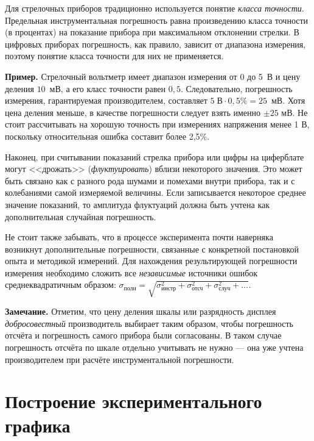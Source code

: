 Для стрелочных приборов традиционно используется понятие \emph{класса
точности}. Предельная инструментальная погрешность равна произведению
класса точности (в процентах) на показание прибора при максимальном
отклонении стрелки. В цифровых приборах погрешность, как правило,
зависит от диапазона измерения, поэтому понятие класса точности для
них не применяется.

{\footnotesize
\textbf{Пример.} Стрелочный вольтметр
имеет диапазон измерения от 0 до 5~В и цену деления $10$~мВ, а
его класс точности равен $0{,}5$. Следовательно, погрешность измерения,
гарантируемая производителем, составляет $5\;\text{В}\cdot0{,}5\%=25$~мВ.
Хотя цена деления меньше, в качестве погрешности следует взять именно
$\pm25$ мВ. Не стоит рассчитывать на хорошую точность при измерениях
напряжения менее 1 В, поскольку относительная ошибка составит более
2,5\%.\par
}%

Наконец, при считывании показаний стрелка прибора или цифры на циферблате
могут <<дрожать>> (\emph{флуктуировать})
вблизи некоторого значения. Это может быть связано как с разного рода
шумами и помехами внутри прибора, так и с колебаниями самой измеряемой
величины. Если записывается некоторое среднее значение показаний,
то амплитуда флуктуаций должна быть учтена как дополнительная случайная
погрешность.

Не стоит также забывать, что в процессе эксперимента почти наверняка
возникнут дополнительные погрешности, связанные с конкретной постановкой
опыта и методикой измерений. Для нахождения результирующей погрешности
измерения необходимо сложить все \emph{независимые} источники ошибок
среднеквадратичным образом: $\sigma_{\text{полн}}=\sqrt{\sigma_{\text{инстр}}^{2}+
\sigma_{\text{отсч}}^{2}+\sigma_{\text{случ}}^{2}+\ldots}$. 

{\footnotesize
\textbf{Замечание.} Отметим, что цену деления шкалы
или разрядность дисплея \emph{добросовестный} производитель
выбирает таким образом, чтобы погрешность отсчёта и погрешность самого
прибора были согласованы. В таком случае погрешность отсчёта по шкале
отдельно учитывать не нужно --- она уже учтена производителем
при расчёте инструментальной погрешности.\par
}%

\section{Построение экспериментального графика}

